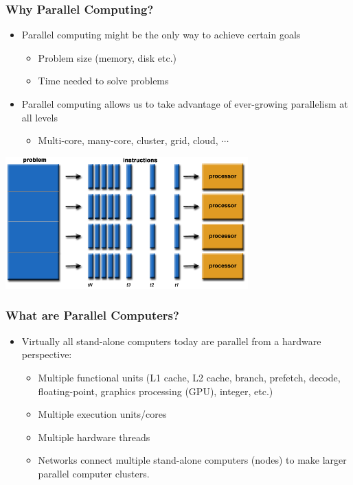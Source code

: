 \documentclass[10pt,t]{beamer}
\begin{document}
\begin{frame}
  \frametitle{Why Parallel Computing?}
  \begin{itemize}
  \item Parallel computing might be the only way to achieve certain goals
    \begin{itemize}
    \item Problem size (memory, disk etc.)
    \item Time needed to solve problems
    \end{itemize}
  \item Parallel computing allows us to take advantage of ever-growing parallelism at all levels
    \begin{itemize}
    \item  Multi-core, many-core, cluster, grid, cloud, $\cdots$
    \end{itemize}
  \end{itemize}
  \begin{center}
    \includegraphics[width=0.7\textwidth]{./parallelProblem}
  \end{center}
\end{frame}

\begin{frame}
  \frametitle{What are Parallel Computers?}
  \begin{itemize}
  \item Virtually all stand-alone computers today are parallel from a hardware perspective:
    \begin{itemize}
    \item Multiple functional units (L1 cache, L2 cache, branch, prefetch, decode, floating-point, graphics processing (GPU), integer, etc.)
    \item Multiple execution units/cores
    \item Multiple hardware threads
    \item Networks connect multiple stand-alone computers (nodes) to make larger parallel computer clusters.
    \end{itemize}
  \end{itemize}
\end{frame}
\end{document}
